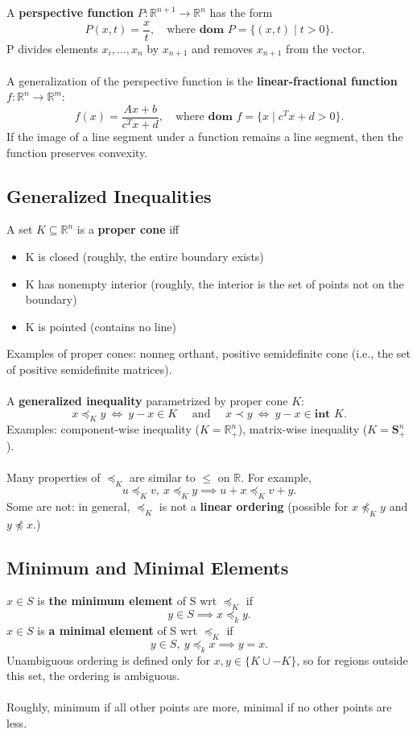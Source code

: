 \documentclass[]{article}
\begin{document}
A \textbf{perspective function} $P: \mathbb{R}^{n+1} \rightarrow \mathbb{R}^{n}$ has the form $$P(x,t)=\frac{x}{t}, \quad \text{where } \textbf{dom } P=\{(x,t) \mid t > 0 \}.$$
P divides elements $x_{i},...,x_{n}$ by $x_{n+1}$ and removes $x_{n+1}$ from the vector. \\\\
A generalization of the perspective function is the \textbf{linear-fractional function} $f : \mathbb{R}^{n} \rightarrow \mathbb{R}^{m}$: $$f(x) = \frac{Ax+b}{c^{T}x+d}, \quad \text{where } \textbf{dom } f = \{x \mid c^{T}x+d>0 \}.$$
If the image of a line segment under a function remains a line segment, then the function preserves convexity.\\

\subsection*{Generalized Inequalities}
A set $K \subseteq \mathbb{R}^{n}$ is a \textbf{proper cone} iff
\begin{itemize}
	\item K is closed (roughly, the entire boundary exists)
	\item K has nonempty interior (roughly, the interior is the set of points not on the boundary)
	\item K is pointed (contains no line) \\
\end{itemize}
Examples of proper cones: nonneg orthant, positive semidefinite cone (i.e., the set of positive semidefinite matrices). \\\\
A \textbf{generalized inequality} parametrized by proper cone $K$: $$x \preceq_{K} y \ \Leftrightarrow \  y-x \in K \quad \text{ and } \quad x \prec y \ \Leftrightarrow \ y-x \in \textbf{int } K.$$
Examples: component-wise inequality ($K=\mathbb{R}^{n}_{+}$), matrix-wise inequality ($K=\boldsymbol{S}^{n}_{+}$). \\\\
Many properties of $\preceq_{K}$ are similar to $\leq$ on $\mathbb{R}$. For example, $$u \preceq_{K} v, \ x \preceq_{K} y \implies u+x \preceq_{K} v+y.$$
Some are not: in general, $\preceq_{K}$ is not a \textbf{linear ordering} (possible for $x \npreceq_{K} y$ and $y \npreceq x$.) \\

\subsection*{Minimum and Minimal Elements}
$x \in S$ is \textbf{the minimum element} of S wrt $\preceq_{K}$ if $$y \in S \implies x \preceq_{k} y.$$
$x \in S$ is \textbf{a minimal element} of S wrt $\preceq_{K}$ if $$y \in S, \ y \preceq_{k} x \implies y=x.$$
Unambiguous ordering is defined only for $x,y \in \{K \cup -K\}$, so for regions outside this set, the ordering is ambiguous. \\\\
Roughly, minimum if all other points are more, minimal if no other points are less.
\end{document}
